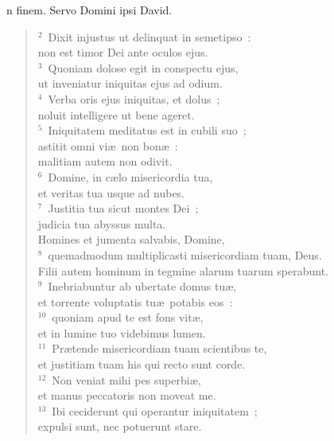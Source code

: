 \bchapter
{}n finem. Servo Domini ipsi David.
\begin{flushleft}\begin{verse}\vspace{6pt}${}^{2}$~Dixit injustus ut delinquat in semetipso~:\\ non est timor Dei ante oculos ejus.\\
${}^{3}$~Quoniam dolose egit in conspectu ejus,\\ ut inveniatur iniquitas ejus ad odium.\\
${}^{4}$~Verba oris ejus iniquitas, et dolus~;\\ noluit intelligere ut bene ageret.\\
${}^{5}$~Iniquitatem meditatus est in cubili suo~;\\ astitit omni vi\ae\ non bon\ae~:\\ malitiam autem non odivit.\\
${}^{6}$~Domine, in c\ae lo misericordia tua,\\ et veritas tua usque ad nubes.\\
${}^{7}$~Justitia tua sicut montes Dei~;\\ judicia tua abyssus multa.\\ Homines et jumenta salvabis, Domine,\\
${}^{8}$~quemadmodum multiplicasti misericordiam tuam, Deus.\\ Filii autem hominum in tegmine alarum tuarum sperabunt.\\
${}^{9}$~Inebriabuntur ab ubertate domus tu\ae ,\\ et torrente voluptatis tu\ae\ potabis eos~:\\
${}^{10}$~quoniam apud te est fons vit\ae ,\\ et in lumine tuo videbimus lumen.\\
${}^{11}$~Pr\ae tende misericordiam tuam scientibus te,\\ et justitiam tuam his qui recto sunt corde.\\
${}^{12}$~Non veniat mihi pes superbi\ae ,\\ et manus peccatoris non moveat me.\\
${}^{13}$~Ibi ceciderunt qui operantur iniquitatem~;\\ expulsi sunt, nec potuerunt stare.\end{verse}\end{flushleft}



